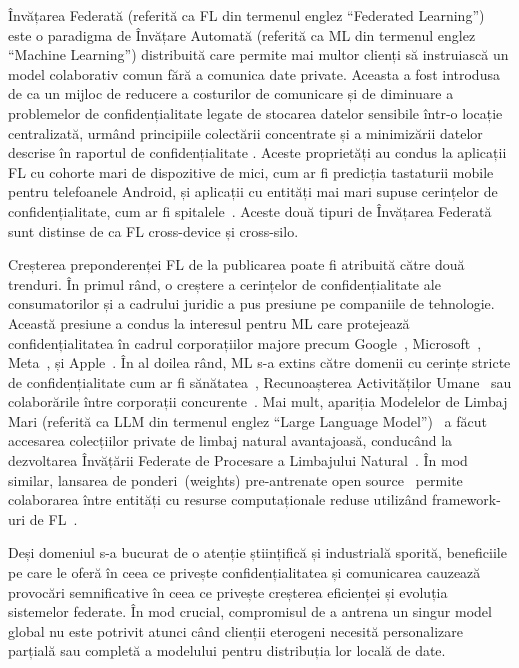Învățarea Federată (referită ca FL din termenul englez ``Federated Learning'') este o paradigma de Învățare Automată (referită ca ML din termenul englez ``Machine Learning'') distribuită care permite mai multor clienți să instruiască un model colaborativ comun fără a comunica date private. Aceasta a fost introdusa de \citet{FedAvg} ca un mijloc de reducere a costurilor de comunicare și de diminuare a problemelor de confidențialitate legate de stocarea datelor sensibile într-o locație centralizată, urmând principiile colectării concentrate și a minimizării datelor descrise în raportul de confidențialitate \citet{White_House_Report}. Aceste proprietăți au condus la aplicații FL cu cohorte mari de dispozitive de mici, cum ar fi predicția tastaturii mobile~\citep{GoogleKeyboard} pentru telefoanele Android, și aplicații cu entități mai mari supuse cerințelor de confidențialitate, cum ar fi spitalele~\citep{FLmedicine}. Aceste două tipuri de Învățarea Federată sunt distinse de \citet{AdvancedAndOpenProblems} ca FL cross-device și cross-silo.

Creșterea preponderenței FL de la publicarea \citet{FedAvg} poate fi atribuită către două trenduri. În primul rând, o creștere a cerințelor de confidențialitate ale consumatorilor și a cadrului juridic a pus presiune pe companiile de tehnologie. Această presiune a condus la interesul pentru ML care protejează confidențialitatea în cadrul corporațiilor majore precum Google~\citep{FedAvg,GoogleKeyboard,ScaleSystemDesign}, Microsoft~\citep{FLINT}, Meta~\citep{PAPAYA,FedBuff}, și Apple~\citep{AppleFL}. În al doilea rând, ML s-a extins către domenii cu cerințe stricte de confidențialitate cum ar fi sănătatea~\citep{FLmedicine}, Recunoașterea Activităților Umane~\citep{HARusingFL_2018,ClusterFL} sau colaborările între corporații concurente~\citep{SustainableIncentive}. Mai mult, apariția Modelelor de Limbaj Mari (referită ca LLM din termenul englez ``Large Language Model'')~\citep{OpportunitiesAndRisksLLM} a făcut accesarea colecțiilor private de limbaj natural avantajoasă, conducând la dezvoltarea Învățării Federate de Procesare a Limbajului Natural~\citep{FedNLP}. În mod similar, lansarea de ponderi~(weights) pre-antrenate open source~\citep{LLaMA} permite colaborarea între entități cu resurse computaționale reduse utilizând framework-uri de FL~\citep{Flower,FedScale,FedML}.

Deși domeniul s-a bucurat de o atenție științifică și industrială sporită, beneficiile pe care le oferă în ceea ce privește confidențialitatea și comunicarea cauzează provocări semnificative în ceea ce privește creșterea eficienței și evoluția sistemelor federate. În mod crucial, compromisul de a antrena un singur model global nu este potrivit atunci când clienții eterogeni necesită personalizare parțială sau completă a modelului pentru distribuția lor locală de date.

